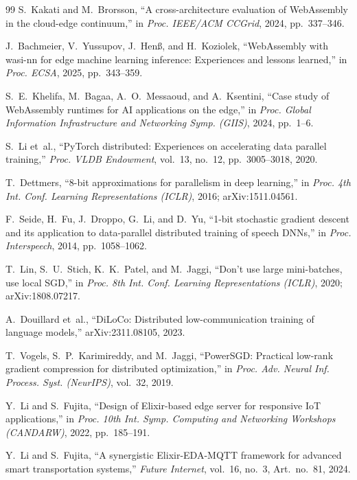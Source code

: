 {\begin{thebibliography}{99}
S.~Kakati and M.~Brorsson,
``A cross-architecture evaluation of WebAssembly in the cloud-edge continuum,''
in \textit{Proc. IEEE/ACM CCGrid}, 2024, pp.~337--346.

J.~Bachmeier, V.~Yussupov, J.~Hen\ss, and H.~Koziolek,
``WebAssembly with wasi-nn for edge machine learning inference: Experiences and lessons learned,''
in \textit{Proc. ECSA}, 2025, pp.~343--359.

S.~E.~Khelifa, M.~Bagaa, A.~O.~Messaoud, and A.~Ksentini,
``Case study of WebAssembly runtimes for AI applications on the edge,''
in \textit{Proc. Global Information Infrastructure and Networking Symp. (GIIS)}, 2024, pp.~1--6.

 S.~Li et~al., ``PyTorch distributed: Experiences on accelerating data parallel training,'' \textit{Proc. VLDB Endowment}, vol.~13, no.~12, pp.~3005--3018, 2020.

 T.~Dettmers, ``8-bit approximations for parallelism in deep learning,'' in \textit{Proc. 4th Int. Conf. Learning Representations (ICLR)}, 2016; arXiv:1511.04561.

 F.~Seide, H.~Fu, J.~Droppo, G.~Li, and D.~Yu, ``1-bit stochastic gradient descent and its application to data-parallel distributed training of speech DNNs,'' in \textit{Proc. Interspeech}, 2014, pp.~1058--1062.

 T.~Lin, S.~U.~Stich, K.~K.~Patel, and M.~Jaggi, ``Don't use large mini-batches, use local SGD,'' in \textit{Proc. 8th Int. Conf. Learning Representations (ICLR)}, 2020; arXiv:1808.07217.

 A.~Douillard et~al., ``DiLoCo: Distributed low-communication training of language models,'' arXiv:2311.08105, 2023.

 T.~Vogels, S.~P.~Karimireddy, and M.~Jaggi, ``PowerSGD: Practical low-rank gradient compression for distributed optimization,'' in \textit{Proc. Adv. Neural Inf. Process. Syst. (NeurIPS)}, vol.~32, 2019.

Y.~Li and S.~Fujita,
``Design of Elixir-based edge server for responsive IoT applications,''
in \textit{Proc. 10th Int. Symp. Computing and Networking Workshops (CANDARW)}, 2022, pp.~185--191.

Y.~Li and S.~Fujita,
``A synergistic Elixir-EDA-MQTT framework for advanced smart transportation systems,''
\textit{Future Internet}, vol.~16, no.~3, Art.~no.~81, 2024.


\end{thebibliography}}

